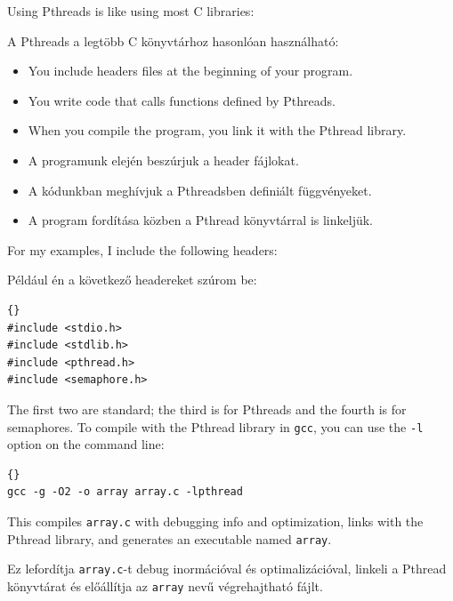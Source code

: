 \documentclass{book}
\begin{document}
Using Pthreads is like using most C libraries:

A Pthreads a legtöbb C könyvtárhoz hasonlóan használható:

\begin{itemize}

\item You include headers files at the beginning of your
program.

\item You write code that calls functions defined by Pthreads.

\item When you compile the program, you link it with the
Pthread library.

\end{itemize}

\begin{itemize}

\item A programunk elején beszúrjuk a header fájlokat.

\item A kódunkban meghívjuk a Pthreadsben definiált függvényeket.

\item A program fordítása közben a Pthread könyvtárral is linkeljük.

\end{itemize}

For my examples, I include the following headers:

Például én a következő headereket szúrom be:

\begin{lstlisting}[title={Headers}]{}
#include <stdio.h>
#include <stdlib.h>
#include <pthread.h>
#include <semaphore.h>
\end{lstlisting}

The first two are standard; the third is for Pthreads and
the fourth is for semaphores.
To compile with the Pthread library in {\tt gcc}, you
can use the {\tt -l}
option on the command line:

\begin{lstlisting}[title={}]{}
gcc -g -O2 -o array array.c -lpthread
\end{lstlisting}

This compiles {\tt array.c} with debugging info and optimization,
links with the Pthread library, and generates an executable
named {\tt array}.

Ez lefordítja {\tt array.c}-t debug inormációval és optimalizációval,
linkeli a Pthread könyvtárat és előállítja az {\tt array} nevű végrehajtható
fájlt.
\end{document}
